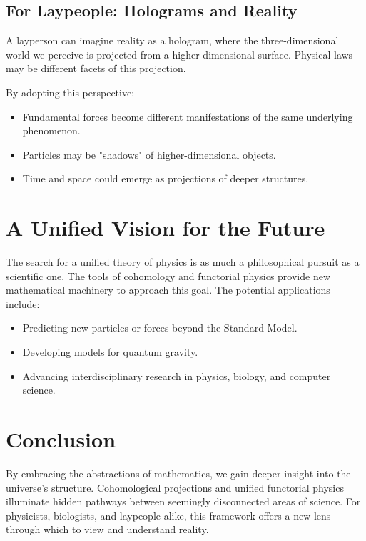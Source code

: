 \documentclass{article}
\begin{document}
\subsection{For Laypeople: Holograms and Reality}
A layperson can imagine reality as a hologram, where the three-dimensional world we perceive is projected from a higher-dimensional surface. Physical laws may be different facets of this projection.

By adopting this perspective:
\begin{itemize}
    \item Fundamental forces become different manifestations of the same underlying phenomenon.
    \item Particles may be "shadows" of higher-dimensional objects.
    \item Time and space could emerge as projections of deeper structures.
\end{itemize}

\section{A Unified Vision for the Future}
The search for a unified theory of physics is as much a philosophical pursuit as a scientific one. The tools of cohomology and functorial physics provide new mathematical machinery to approach this goal. The potential applications include:
\begin{itemize}
    \item Predicting new particles or forces beyond the Standard Model.
    \item Developing models for quantum gravity.
    \item Advancing interdisciplinary research in physics, biology, and computer science.
\end{itemize}

\section{Conclusion}
By embracing the abstractions of mathematics, we gain deeper insight into the universe’s structure. Cohomological projections and unified functorial physics illuminate hidden pathways between seemingly disconnected areas of science. For physicists, biologists, and laypeople alike, this framework offers a new lens through which to view and understand reality.
\end{document}
